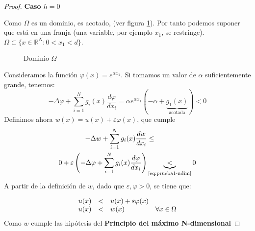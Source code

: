 \newpage
\begin{proof}
\textbf{Caso $h = 0$}

Como $\Omega$ es un dominio, es acotado, (ver figura \ref{fig:omega}). Por tanto podemos suponer que está en una franja (una variable, por ejemplo $x_1$, se restringe). $\Omega \subset \{x\in \mathbb{R}^N: 0 < x_1 < d\}$.

\begin{figure}[ht]
\centering
{}
\caption{Dominio $\Omega$}
\label{fig:omega}
\end{figure}
Consideramos la función $\varphi(x) = e^{\alpha x_1}$.
Si tomamos un valor de $\alpha$ suficientemente grande, tenemos:
\begin{equation}\label{eq:prueba1-ndim}
-\Delta\varphi + \sum_{i=1}^Ng_i(x)\frac{d\varphi}{dx_i} = \alpha e^{\alpha x_1}\left(-\alpha + \underbrace{g_1(x)}_{\text{acotada}}\right) < 0
\end{equation}
Definimos ahora $w(x) = u(x) + \varepsilon\varphi(x)$, que cumple
\begin{align*}
-\Delta w + \sum_{i=1}^{N}g_i(x)\frac{dw}{dx_i} & \le\\
0 + \varepsilon\left(-\Delta\varphi + \sum_{i=1}^{N}g_i(x)\frac{d\varphi}{dx_i}\right) & \underbrace{<}_{\text{\eqref{eq:prueba1-ndim}}} 0
\end{align*}
A partir de la definición de $w$, dado que $\varepsilon, \varphi > 0$, se tiene que:

\begin{equation*}
\begin{array}{l l l l}
u(x) & < & u(x) + \varepsilon\varphi(x) & \\
u(x) & < & w(x) & \forall x \in \Omega\\
\end{array}
\end{equation*}
Como $w$ cumple las hipótesis del \textbf{Principio del máximo N-dimensional}


\end{proof}
